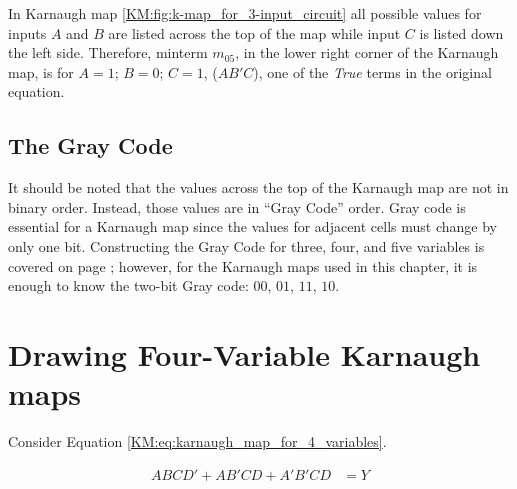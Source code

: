 \begin{figure}[H]
\end{figure}

In Karnaugh map \ref{KM:fig:k-map_for_3-input_circuit} all possible values for inputs $ A $ and $ B $ are listed across the top of the map while input $ C $ is listed down the left side. Therefore, minterm $ m_{05} $, in the lower right corner of the Karnaugh map, is for $ A=1 $; $ B=0 $; $ C=1 $, ($ AB'C $), one of the \emph{True} terms in the original equation. 

\subsection{The Gray Code}
\label{KM:subsec:the_gray_code_for_karnaugh_maps}

It should be noted that the values across the top of the Karnaugh map are not in binary order. Instead, those values are in ``Gray Code'' order. Gray code is essential for a Karnaugh map since the values for adjacent cells must change by only one bit. Constructing the Gray Code for three, four, and five variables is covered on page \pageref{MO:subsub:gray_code}; however, for the Karnaugh maps used in this chapter, it is enough to know the two-bit Gray code: $ 00 $, $ 01 $, $ 11 $, $ 10 $. 

\section{Drawing Four-Variable Karnaugh maps}
\label{KM:sec:drawing_4-variable_karnaugh_maps}

Consider Equation \ref{KM:eq:karnaugh_map_for_4_variables}.

\begin{align}
  \label{KM:eq:karnaugh_map_for_4_variables}
  ABCD'+AB'CD+A'B'CD &= Y
\end{align}

